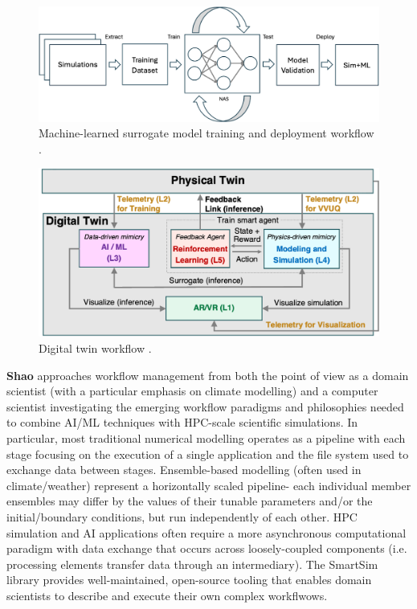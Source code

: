 \documentclass[utf8]{FrontiersinVancouver} %
\begin{document}
\begin{figure}
    \centering
    \includegraphics[width=0.8\linewidth]{images/workflow-surrogate-model.png}
    \caption{Machine-learned surrogate model training and deployment workflow \cite{brewer2023entropy}.}
    \label{fig:surrogate}
\end{figure}

\begin{figure}
    \centering
    \includegraphics[width=0.8\linewidth]{images/workflow-digital-twin.png}
    \caption{Digital twin workflow \cite{brewer2024digital}.}
    \label{fig:dt}
\end{figure}


{\bf Shao} approaches workflow management from both the point of view as a domain scientist (with a particular emphasis on climate modelling) and a computer scientist investigating the emerging workflow paradigms and philosophies needed to combine AI/ML techniques with HPC-scale scientific simulations. In particular, most traditional numerical modelling operates as a pipeline with each stage focusing on the execution of a single application and the file system used to exchange data between stages. Ensemble-based modelling (often used in climate/weather) represent a horizontally scaled pipeline- each individual member ensembles may differ by the values of their tunable parameters and/or the initial/boundary conditions, but run independently of each other. HPC simulation and AI applications often require a more asynchronous computational paradigm with data exchange that occurs across loosely-coupled components (i.e. processing elements transfer data through an intermediary). The SmartSim library provides well-maintained, open-source tooling that enables domain scientists to describe and execute their own complex workflwows.
\end{document}
